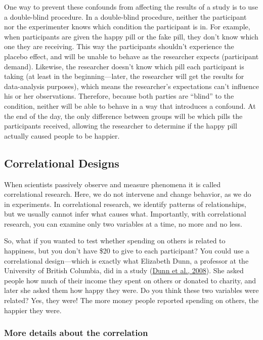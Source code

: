 \documentclass[
]{krantz}
\begin{document}
One way to prevent these confounds from affecting the results of a study is to use a double-blind procedure. In a double-blind procedure, neither the participant nor the experimenter knows which condition the participant is in. For example, when participants are given the happy pill or the fake pill, they don't know which one they are receiving. This way the participants shouldn't experience the placebo effect, and will be unable to behave as the researcher expects (participant demand). Likewise, the researcher doesn't know which pill each participant is taking (at least in the beginning---later, the researcher will get the results for data-analysis purposes), which means the researcher's expectations can't influence his or her observations. Therefore, because both parties are ``blind'' to the condition, neither will be able to behave in a way that introduces a confound. At the end of the day, the only difference between groups will be which pills the participants received, allowing the researcher to determine if the happy pill actually caused people to be happier.

\hypertarget{correlational-designs}{%
\subsection*{Correlational Designs}\label{correlational-designs}}


When scientists passively observe and measure phenomena it is called correlational research. Here, we do not intervene and change behavior, as we do in experiments. In correlational research, we identify patterns of relationships, but we usually cannot infer what causes what. Importantly, with correlational research, you can examine only two variables at a time, no more and no less.

So, what if you wanted to test whether spending on others is related to happiness, but you don't have \$20 to give to each participant? You could use a correlational design---which is exactly what Elizabeth Dunn, a professor at the University of British Columbia, did in a study (\protect\hyperlink{ref-dunn2008}{Dunn et al., 2008}). She asked people how much of their income they spent on others or donated to charity, and later she asked them how happy they were. Do you think these two variables were related? Yes, they were! The more money people reported spending on others, the happier they were.

\hypertarget{more-details-about-the-correlation}{%
\subsubsection*{More details about the correlation}\label{more-details-about-the-correlation}}
\end{document}
